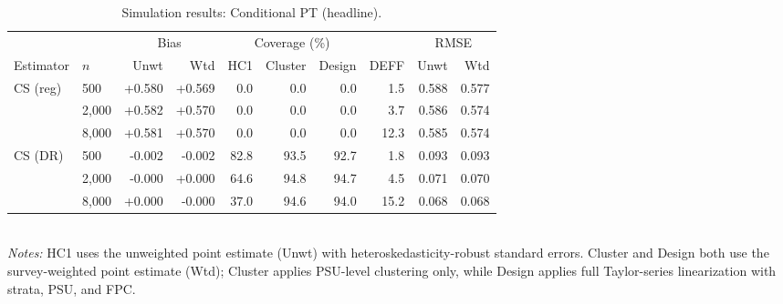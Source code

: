 \begin{table}[ht]
\centering
\small
\caption{Simulation results: Conditional PT (headline).}
\label{tab:sim-s4}
\begin{tabular}{@{}llrrrrrrrr@{}}
\toprule
 & & \multicolumn{2}{c}{Bias} & \multicolumn{3}{c}{Coverage (\%)} &  & \multicolumn{2}{c}{RMSE} \\
\cmidrule(lr){3-4} \cmidrule(lr){5-7} \cmidrule(lr){9-10}
{Estimator} & {$n$} & {Unwt} & {Wtd} & {HC1} & {Cluster} & {Design} & {DEFF} & {Unwt} & {Wtd} \\
\midrule
CS (reg) & 500 & +0.580 & +0.569 & 0.0 & 0.0 & 0.0 & 1.5 & 0.588 & 0.577 \\
 & 2,000 & +0.582 & +0.570 & 0.0 & 0.0 & 0.0 & 3.7 & 0.586 & 0.574 \\
 & 8,000 & +0.581 & +0.570 & 0.0 & 0.0 & 0.0 & 12.3 & 0.585 & 0.574 \\
CS (DR) & 500 & -0.002 & -0.002 & 82.8 & 93.5 & 92.7 & 1.8 & 0.093 & 0.093 \\
 & 2,000 & -0.000 & +0.000 & 64.6 & 94.8 & 94.7 & 4.5 & 0.071 & 0.070 \\
 & 8,000 & +0.000 & -0.000 & 37.0 & 94.6 & 94.0 & 15.2 & 0.068 & 0.068 \\
\bottomrule
\end{tabular}
\\[2pt]\footnotesize \emph{Notes:} HC1 uses the unweighted point estimate (Unwt) with heteroskedasticity-robust standard errors. Cluster and Design both use the survey-weighted point estimate (Wtd); Cluster applies PSU-level clustering only, while Design applies full Taylor-series linearization with strata, PSU, and FPC.
\end{table}
